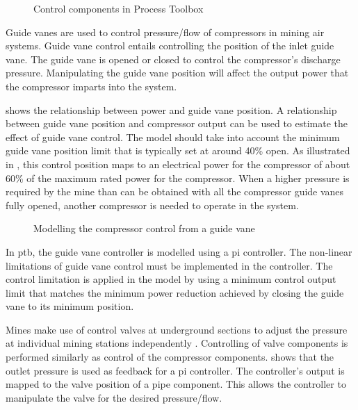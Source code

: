 	\begin{figure}[h!]
		\centering
		\caption[Control components in Process Toolbox]{Control components in Process Toolbox}
		\label{fig: Controller models}
	\end{figure}
		Guide vanes are used to control pressure/flow of compressors in mining air systems. Guide vane control entails controlling the position of the inlet guide vane. The guide vane is opened or closed to control the compressor's discharge pressure. Manipulating the guide vane position will affect the output power that the compressor imparts into the system. 
		\par 
		 shows the relationship between power and guide vane position. A relationship between guide vane position and compressor output can be used to estimate the effect of guide vane control. The model should take into account the minimum guide vane position limit that is typically set at around 40\% open. As illustrated in , this control position maps to an electrical power for the compressor of about 60\% of the maximum rated power for the compressor. When a higher pressure is required by the mine than can be obtained with all the compressor guide vanes fully opened, another compressor is needed to operate in the system. 
		\begin{figure}[h]
			\centering
			\fbox{}
			\caption{Modelling the compressor control from a guide vane\protect \footnotemark[1]}
			\label{fig: Guide vane position}
		\end{figure}
	
	
		In \gls{ptb}, the guide vane controller is modelled using a \gls{pi} controller. The non-linear limitations of guide vane control must be implemented in the controller. The control limitation is applied in the model by using a minimum control output limit that matches the minimum power reduction achieved by closing the guide vane to its minimum position. 
		\par 
		Mines make use of control valves at underground sections to adjust the pressure at individual mining stations independently \cite{Heyns2014Masters}. Controlling of valve components is performed similarly as control of the compressor components.  shows that the outlet pressure is used as feedback for a \gls{pi} controller. The controller's output is mapped to the valve position of a pipe component. This allows the controller to manipulate the valve for the desired pressure/flow.

